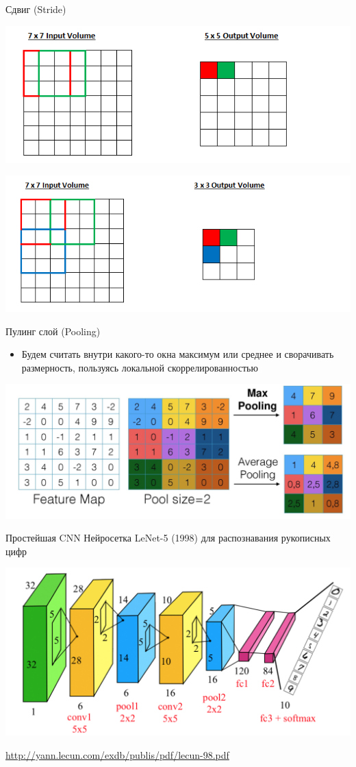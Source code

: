 \documentclass[notes,12pt, aspectratio=169]{beamer}
\begin{document}
\begin{frame}{Сдвиг (Stride)}
\begin{center}
	\includegraphics[width=.5\linewidth]{Stride1.png}
\end{center}
\vfill
\begin{center}
	\includegraphics[width=.5\linewidth]{Stride2.png}
\end{center}
\end{frame}


\begin{frame}{Пулинг слой (Pooling)}
\begin{itemize}
	\item  Будем считать внутри какого-то окна максимум или среднее и сворачивать размерность, пользуясь локальной скоррелированностью 
\end{itemize}

\begin{center}
	\includegraphics[width=.7\linewidth]{pooling.png}
\end{center}
\end{frame}


\begin{frame}{Простейшая CNN}
Нейросетка LeNet-5  (1998) для распознавания рукописных цифр

\begin{center}
	\includegraphics[width=.8\linewidth]{lenet.png}
\end{center}

\vfill
\footnotesize
{\color{blue} \url{http://yann.lecun.com/exdb/publis/pdf/lecun-98.pdf}}
\end{frame}
\end{document}
